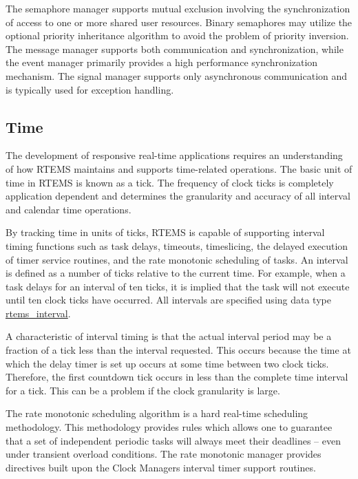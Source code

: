 The semaphore manager supports mutual exclusion involving the synchronization of access to one or more shared user resources. Binary semaphores may utilize the optional priority inheritance algorithm to avoid the problem of priority inversion. The message manager supports both communication and synchronization, while the event manager primarily provides a high performance synchronization mechanism. The signal manager supports only asynchronous communication and is typically used for exception handling.\hypertarget{group__RTEMSAPIClassic_ClassicRTEMSSecTime}{}\subsection{Time}\label{group__RTEMSAPIClassic_ClassicRTEMSSecTime}
The development of responsive real-\/time applications requires an understanding of how R\+T\+E\+MS maintains and supports time-\/related operations. The basic unit of time in R\+T\+E\+MS is known as a tick. The frequency of clock ticks is completely application dependent and determines the granularity and accuracy of all interval and calendar time operations.

By tracking time in units of ticks, R\+T\+E\+MS is capable of supporting interval timing functions such as task delays, timeouts, timeslicing, the delayed execution of timer service routines, and the rate monotonic scheduling of tasks. An interval is defined as a number of ticks relative to the current time. For example, when a task delays for an interval of ten ticks, it is implied that the task will not execute until ten clock ticks have occurred. All intervals are specified using data type \mbox{\hyperlink{group__ClassicTasks_gad39c43f949683d46874e3a5586b93aee}{rtems\+\_\+interval}}.

A characteristic of interval timing is that the actual interval period may be a fraction of a tick less than the interval requested. This occurs because the time at which the delay timer is set up occurs at some time between two clock ticks. Therefore, the first countdown tick occurs in less than the complete time interval for a tick. This can be a problem if the clock granularity is large.

The rate monotonic scheduling algorithm is a hard real-\/time scheduling methodology. This methodology provides rules which allows one to guarantee that a set of independent periodic tasks will always meet their deadlines -- even under transient overload conditions. The rate monotonic manager provides directives built upon the Clock Manager\textquotesingle{}s interval timer support routines.

